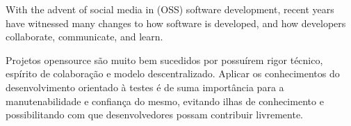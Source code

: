 \documentclass[
	article,			%
	12pt,				%
	oneside,			%
	a4paper,			%
	english,			
	brazil,
	sumario=tradicional
	]{abntex2}
\begin{document}
\begin{citacao}
With the advent of social media in (OSS) software development, recent years have witnessed many changes to how software is developed, and how developers collaborate, communicate, and learn.

\cite[Introduction]{testdrivendevelopment.1}

\end{citacao}

Projetos opensource são muito bem sucedidos por possuírem rigor técnico, espírito de colaboração e modelo descentralizado. Aplicar os conhecimentos do desenvolvimento orientado à testes é de suma importância para a manutenabilidade e confiança do mesmo, evitando ilhas de conhecimento e possibilitando com que desenvolvedores possam contribuir livremente.





\postextual

\pagebreak

\nocite{cpluspluscom.1}
\nocite{cmakeorg.1}
\nocite{gitscm.1}
\nocite{gitscm.2}
\nocite{gitscm.3}
\nocite{gitscm.4}
\nocite{gitscm.5}
\nocite{gitscm.6}
\nocite{cxxtest.1}


%
%



\end{document}
